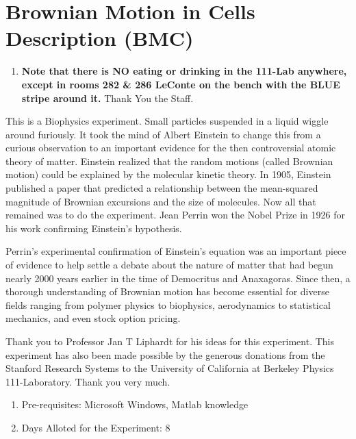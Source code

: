 \documentclass{../lab}
\begin{document}
\maketitle

\tableofcontents

\section{Brownian Motion in Cells Description (BMC)}

\begin{enumerate}
    \item \textbf{Note that there is NO eating or drinking in the 111-Lab anywhere, except in rooms 282 \& 286 LeConte on the bench with the BLUE stripe around it.} Thank You the Staff.
\end{enumerate}

This is a Biophysics experiment. Small particles suspended in a liquid wiggle around furiously. It took the mind of Albert Einstein to change this from a curious observation to an important evidence for the then controversial atomic theory of matter. Einstein realized that the random motions (called Brownian motion) could be explained by the molecular kinetic theory. In 1905, Einstein published a paper that predicted a relationship between the mean-squared magnitude of Brownian excursions and the size of molecules. Now all that remained was to do the experiment. Jean Perrin won the Nobel Prize in 1926 for his work confirming Einstein's hypothesis.

Perrin's experimental confirmation of Einstein's equation was an important piece of evidence to help settle a debate about the nature of matter that had begun nearly 2000 years earlier in the time of Democritus and Anaxagoras. Since then, a thorough understanding of Brownian motion has become essential for diverse fields ranging from polymer physics to biophysics, aerodynamics to statistical mechanics, and even stock option pricing.

Thank you to Professor Jan T Liphardt for his ideas for this experiment. This experiment has also been made possible by the generous donations from the Stanford Research Systems to the University of California at Berkeley Physics 111-Laboratory. Thank you very much.

\begin{enumerate}
    \item Pre-requisites: Microsoft Windows, Matlab knowledge

    \item Days Alloted for the Experiment: 8
\end{enumerate}
\end{document}
